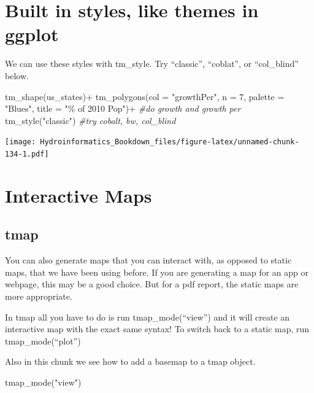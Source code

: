 \documentclass[
]{book}
\newenvironment{Shaded}{\begin{snugshade}}{\end{snugshade}}
\newcommand{\AttributeTok}[1]{\textcolor[rgb]{0.77,0.63,0.00}{#1}}
\newcommand{\CommentTok}[1]{\textcolor[rgb]{0.56,0.35,0.01}{\textit{#1}}}
\newcommand{\DecValTok}[1]{\textcolor[rgb]{0.00,0.00,0.81}{#1}}
\newcommand{\FunctionTok}[1]{\textcolor[rgb]{0.00,0.00,0.00}{#1}}
\newcommand{\NormalTok}[1]{#1}
\newcommand{\SpecialCharTok}[1]{\textcolor[rgb]{0.00,0.00,0.00}{#1}}
\newcommand{\StringTok}[1]{\textcolor[rgb]{0.31,0.60,0.02}{#1}}
\begin{document}
\hypertarget{built-in-styles-like-themes-in-ggplot}{%
\section{Built in styles, like themes in ggplot}\label{built-in-styles-like-themes-in-ggplot}}

We can use these styles with tm\_style. Try ``classic'', ``coblat'', or ``col\_blind'' below.

\begin{Shaded}
\begin{Highlighting}[]
\FunctionTok{tm\_shape}\NormalTok{(us\_states)}\SpecialCharTok{+}
  \FunctionTok{tm\_polygons}\NormalTok{(}\AttributeTok{col =} \StringTok{"growthPer"}\NormalTok{, }\AttributeTok{n =} \DecValTok{7}\NormalTok{, }
              \AttributeTok{palette =} \StringTok{"Blues"}\NormalTok{, }\AttributeTok{title =} \StringTok{"\% of 2010 Pop"}\NormalTok{)}\SpecialCharTok{+} \CommentTok{\#do growth and growth per}
  \FunctionTok{tm\_style}\NormalTok{(}\StringTok{"classic"}\NormalTok{) }\CommentTok{\#try cobalt, bw, col\_blind}
\end{Highlighting}
\end{Shaded}

\texttt{[image: Hydroinformatics\_Bookdown\_files/figure-latex/unnamed-chunk-134-1.pdf]}

\hypertarget{interactive-maps}{%
\section{Interactive Maps}\label{interactive-maps}}

\hypertarget{tmap}{%
\subsection{tmap}\label{tmap}}

You can also generate maps that you can interact with, as opposed to static maps, that we have been using before. If you are generating a map for an app or webpage, this may be a good choice. But for a pdf report, the static maps are more appropriate.

In tmap all you have to do is run tmap\_mode(``view'') and it will create an interactive map with the exact same syntax! To switch back to a static map, run tmap\_mode(``plot'')

Also in this chunk we see how to add a basemap to a tmap object.

\begin{Shaded}
\begin{Highlighting}[]
\FunctionTok{tmap\_mode}\NormalTok{(}\StringTok{"view"}\NormalTok{)}
\end{Highlighting}
\end{Shaded}
\end{document}
